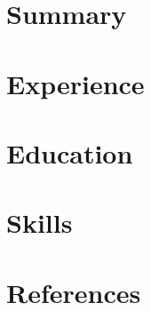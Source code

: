\documentclass[11pt,a4paper]{moderncv}
\begin{document}
\makecvtitle

\section{Summary}

\section{Experience}

\section{Education}

\section{Skills}

\section{References}
\end{document}

